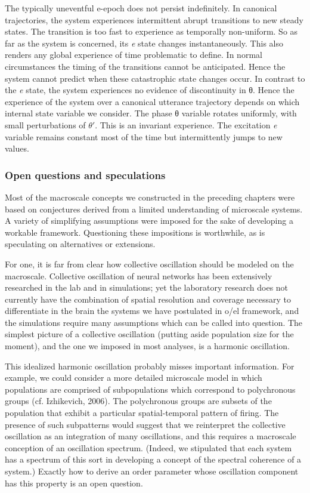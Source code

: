   The typically uneventful e-epoch does not persist indefinitely. In canonical trajectories, the system experiences intermittent abrupt transitions to new steady states. The transition is too fast to experience as temporally non-uniform. So as far as the system is concerned, its \textit{e} state changes instantaneously. This also renders any global experience of time problematic to define. In normal circumstances the timing of the transitions cannot be anticipated. Hence the system cannot predict when these catastrophic state changes occur. In contrast to the \textit{e} state, the system experiences no evidence of discontinuity in θ. Hence the experience of the system over a canonical utterance trajectory depends on which internal state variable we consider. The phase θ variable rotates uniformly, with small perturbations of $\theta ′$. This is an invariant experience. The excitation \textit{e} variable remains constant most of the time but intermittently jumps to new values. 

\subsubsection{Open questions and speculations}

Most of the macroscale concepts we constructed in the preceding chapters were based on conjectures derived from a limited understanding of microscale systems. A variety of simplifying assumptions were imposed for the sake of developing a workable framework. Questioning these impositions is worthwhile, as is speculating on alternatives or extensions.

  For one, it is far from clear how collective oscillation should be modeled on the macroscale. Collective oscillation of neural networks has been extensively researched in the lab and in simulations; yet the laboratory research does not currently have the combination of spatial resolution and coverage necessary to differentiate in the brain the systems we have postulated in o/el framework, and the simulations require many assumptions which can be called into question. The simplest picture of a collective oscillation (putting aside population size for the moment), and the one we imposed in most analyses, is a harmonic oscillation.

  This idealized harmonic oscillation probably misses important information. For example, we could consider a more detailed microscale model in which populations are comprised of subpopulations which correspond to polychronous groups (cf. Izhikevich, 2006). The polychronous groups are subsets of the population that exhibit a particular spatial-temporal pattern of firing. The presence of such subpatterns would suggest that we reinterpret the collective oscillation as an integration of many oscillations, and this requires a macroscale conception of an oscillation spectrum. (Indeed, we stipulated that each system has a spectrum of this sort in developing a concept of the spectral coherence of a system.) Exactly how to derive an order parameter whose oscillation component has this property is an open question.

